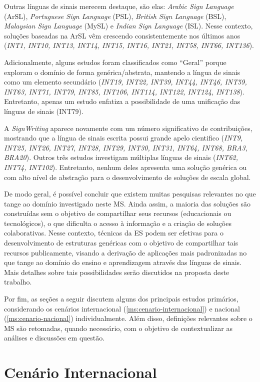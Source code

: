 Outras línguas de sinais merecem destaque, são elas: \textit{Arabic Sign Language} (ArSL), \textit{Portuguese Sign Language} (PSL), \textit{British Sign Language} (BSL), \textit{Malaysian Sign Language} (MySL) e \textit{Indian Sign Language} (ISL). Nesse contexto, soluções baseadas na ArSL vêm crescendo consistentemente nos últimos anos (\textit{INT1, INT10, INT13, INT14, INT15, INT16, INT21, INT58, INT66, INT136}).

Adicionalmente, alguns estudos foram classificados como ``Geral'' porque exploram o domínio de forma genérica/abstrata, mantendo a língua de sinais como um elemento secundário (\textit{INT19, INT22, INT39, INT44, INT46, INT59, INT63, INT71, INT79, INT85, INT106, INT114, INT122, INT124, INT138}). Entretanto, apenas um estudo enfatiza a possibilidade de uma unificação das línguas de sinais (INT79).

A \textit{SignWriting} aparece novamente com um número significativo de contribuições, mostrando que a língua de sinais escrita possui grande apelo cientifico (\textit{INT9, INT25, INT26, INT27, INT28, INT29, INT30, INT31, INT64, INT68, BRA3, BRA20}). Outros três estudos investigam múltiplas línguas de sinais (\textit{INT62, INT74, INT102}). Entretanto, nenhum deles apresenta uma solução genérica ou com alto nível de abstração para o desenvolvimento de soluções de escala global.

De modo geral, é possível concluir que existem muitas pesquisas relevantes no que tange ao domínio investigado neste MS. Ainda assim, a maioria das soluções são construídas sem o objetivo de compartilhar seus recursos (educacionais ou tecnológicos), o que dificulta o acesso à informação e a criação de soluções colaborativas. Nesse contexto, técnicas da ES podem ser efetivas para o desenvolvimento de estruturas genéricas com o objetivo de compartilhar tais recursos publicamente, visando a derivação de aplicações mais padronizadas no que tange ao domínio do ensino e aprendizagem através das línguas de sinais. Mais detalhes sobre tais possibilidades serão discutidos na proposta deste trabalho.

Por fim, as seções a seguir discutem alguns dos principais estudos primários, considerando os cenários internacional (\autoref{ms:cenario-internacional}) e nacional (\autoref{ms:cenario-nacional}) individualmente. Além disso, definições relevantes sobre o MS são retomadas, quando necessário, com o objetivo de contextualizar as análises e discussões em questão.

\section{Cenário Internacional}
\label{ms:cenario-internacional}

